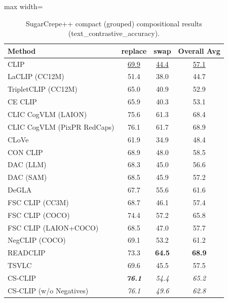 \begin{table}[t]
  \centering
  \scriptsize
  \caption{SugarCrepe++ compact (grouped) compositional results (text_contrastive_accuracy).}
  \label{tab:SugarCrepe++_compact}
  \begin{adjustbox}{max width=\textwidth}
  \setlength{\tabcolsep}{2pt}
  \begin{tabular}{p{5cm}cc|c}
    \toprule
    Method & replace & swap & Overall Avg \\
    \midrule
    CLIP & \underline{69.9} & \underline{44.4} & \underline{57.1} \\
    \midrule
    LaCLIP (CC12M) & 51.4 & 38.0 & 44.7 \\
    TripletCLIP (CC12M) & 65.0 & 40.9 & 52.9 \\
    \midrule
    CE CLIP & 65.9 & 40.3 & 53.1 \\
    CLIC CogVLM (LAION) & 75.6 & 61.3 & 68.4 \\
    CLIC CogVLM (PixPR RedCaps) & 76.1 & 61.7 & 68.9 \\
    CLoVe & 61.9 & 34.9 & 48.4 \\
    CON CLIP & 68.9 & 48.0 & 58.5 \\
    DAC (LLM) & 68.3 & 45.0 & 56.6 \\
    DAC (SAM) & 68.5 & 45.9 & 57.2 \\
    DeGLA & 67.7 & 55.6 & 61.6 \\
    FSC CLIP (CC3M) & 68.7 & 46.1 & 57.4 \\
    FSC CLIP (COCO) & 74.4 & 57.2 & 65.8 \\
    FSC CLIP (LAION+COCO) & 68.5 & 47.0 & 57.7 \\
    NegCLIP (COCO) & 69.1 & 53.2 & 61.2 \\
    READCLIP & 73.3 & \textbf{64.5} & \textbf{68.9} \\
    TSVLC & 69.6 & 45.5 & 57.5 \\
    \midrule
    CS-CLIP & \emph{\textbf{76.1}} & \emph{54.4} & \emph{65.2} \\
    CS-CLIP (w/o Negatives) & \emph{76.1} & \emph{49.6} & \emph{62.8} \\
    \bottomrule
  \end{tabular}
  \end{adjustbox}
\end{table}